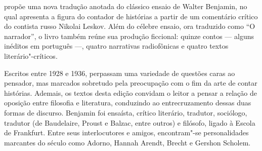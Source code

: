 \hspace*{-7cm}\hrulefill\hspace*{-7cm}

\medskip

 propõe uma nova tradução anotada do clássico ensaio de Walter Benjamin, no qual apresenta a figura do contador de histórias a partir de um comentário crítico do contista russo Nikolai Leskov. Além do célebre ensaio, ora traduzido como “O narrador”, o livro também reúne sua produção ficcional: quinze contos --- alguns inéditos em português ---, quatro narrativas radiofônicas e quatro textos literário"-críticos.

Escritos entre 1928 e 1936, perpassam uma variedade de questões caras ao pensador, mas marcados sobretudo pela preocupação com o fim da arte de contar histórias. Ademais, os textos desta edição convidam o leitor a pensar a relação de oposição entre filosofia e literatura, conduzindo ao entrecruzamento dessas duas formas de discurso. Benjamin foi ensaísta, crítico literário, tradutor, sociólogo, tradutor (de Baudelaire, Proust e Balzac, entre outros) e filósofo, ligado à Escola de Frankfurt. Entre seus interlocutores e amigos, encontram"-se personalidades marcantes do século  como Adorno, Hannah Arendt, Brecht e Gershon Scholem.


\vfill

\hspace*{-.4cm}\begin{minipage}[c]{.5\linewidth}
\small{
{}}
\end{minipage}


\pagebreak

